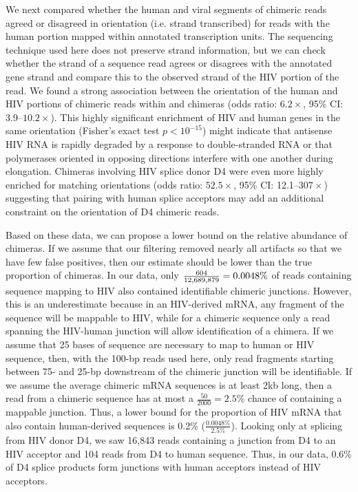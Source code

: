 \documentclass[../sherrill-Mix_thesis.tex]{subfiles}
\begin{document}
		 We next compared whether the human and viral segments of chimeric reads agreed or disagreed in orientation (i.e. strand transcribed) for reads with the human portion mapped within annotated transcription units. The sequencing technique used here does not preserve strand information, but we can check whether the strand of a sequence read agrees or disagrees with the annotated gene strand and compare this to the observed strand of the HIV portion of the read. We found a strong association between the orientation of the human and HIV portions of chimeric reads within \threePrime{} and \fivePrime{} chimeras (odds ratio: $6.2\times$, 95\% CI: 3.9--$10.2\times$). This highly significant enrichment of HIV and human genes in the same orientation (Fisher's exact test $p<10^{-15}$) might indicate that antisense HIV RNA is rapidly degraded by a response to double-stranded RNA or that polymerases oriented in opposing directions interfere with one another during elongation. Chimeras involving HIV splice donor D4 were even more highly enriched for matching orientations (odds ratio: $52.5\times$, 95\% CI: 12.1--$307\times$) suggesting that pairing with human splice acceptors may add an additional constraint on the orientation of D4 chimeric reads.


		Based on these data, we can propose a lower bound on the relative abundance of chimeras. If we assume that our filtering removed nearly all artifacts so that we have few false positives, then our estimate should be lower than the true proportion of chimeras. In our data, only $\frac{604}{12,689,879{}} = 0.0048\%$ of reads containing sequence mapping to HIV also contained identifiable chimeric junctions. However, this is an underestimate because in an HIV-derived mRNA, any fragment of the sequence will be mappable to HIV, while for a chimeric sequence only a read spanning the HIV-human junction will allow identification of a chimera. If we assume that 25 bases of sequence are necessary to map to human or HIV sequence, then, with the 100-bp reads used here, only read fragments starting between 75- and 25-bp downstream of the chimeric junction will be identifiable. If we assume the average chimeric mRNA sequences is at least 2kb long, then a read from a chimeric sequence has at most a $\frac{50}{2000}=2.5\%$ chance of containing a mappable junction. Thus, a lower bound for the proportion of HIV mRNA that also contain human-derived sequences is 0.2\% ($\frac{0.0048\textrm{\%}}{2.5\%}$). Looking only at splicing from HIV donor D4, we saw 16,843 reads containing a junction from D4 to an HIV acceptor and 104 reads from D4 to human sequence. Thus, in our data, 0.6\% of D4 splice products form junctions with human acceptors instead of HIV acceptors.
\end{document}
